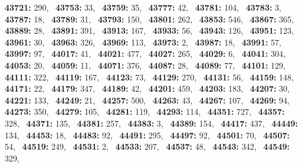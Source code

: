 \textbf{43721:} 290,\allowbreak~ 
\textbf{43753:} 33,\allowbreak~ 
\textbf{43759:} 35,\allowbreak~ 
\textbf{43777:} 42,\allowbreak~ 
\textbf{43781:} 104,\allowbreak~ 
\textbf{43783:} 3,\allowbreak~ 
\textbf{43787:} 18,\allowbreak~ 
\textbf{43789:} 31,\allowbreak~ 
\textbf{43793:} 150,\allowbreak~ 
\textbf{43801:} 262,\allowbreak~ 
\textbf{43853:} 546,\allowbreak~ 
\textbf{43867:} 365,\allowbreak~ 
\textbf{43889:} 28,\allowbreak~ 
\textbf{43891:} 391,\allowbreak~ 
\textbf{43913:} 167,\allowbreak~ 
\textbf{43933:} 56,\allowbreak~ 
\textbf{43943:} 126,\allowbreak~ 
\textbf{43951:} 123,\allowbreak~ 
\textbf{43961:} 30,\allowbreak~ 
\textbf{43963:} 326,\allowbreak~ 
\textbf{43969:} 113,\allowbreak~ 
\textbf{43973:} 2,\allowbreak~ 
\textbf{43987:} 18,\allowbreak~ 
\textbf{43991:} 57,\allowbreak~ 
\textbf{43997:} 97,\allowbreak~ 
\textbf{44017:} 41,\allowbreak~ 
\textbf{44021:} 477,\allowbreak~ 
\textbf{44027:} 265,\allowbreak~ 
\textbf{44029:} 6,\allowbreak~ 
\textbf{44041:} 304,\allowbreak~ 
\textbf{44053:} 20,\allowbreak~ 
\textbf{44059:} 11,\allowbreak~ 
\textbf{44071:} 376,\allowbreak~ 
\textbf{44087:} 28,\allowbreak~ 
\textbf{44089:} 77,\allowbreak~ 
\textbf{44101:} 129,\allowbreak~ 
\textbf{44111:} 322,\allowbreak~ 
\textbf{44119:} 167,\allowbreak~ 
\textbf{44123:} 73,\allowbreak~ 
\textbf{44129:} 270,\allowbreak~ 
\textbf{44131:} 56,\allowbreak~ 
\textbf{44159:} 148,\allowbreak~ 
\textbf{44171:} 22,\allowbreak~ 
\textbf{44179:} 347,\allowbreak~ 
\textbf{44189:} 42,\allowbreak~ 
\textbf{44201:} 459,\allowbreak~ 
\textbf{44203:} 183,\allowbreak~ 
\textbf{44207:} 30,\allowbreak~ 
\textbf{44221:} 133,\allowbreak~ 
\textbf{44249:} 21,\allowbreak~ 
\textbf{44257:} 500,\allowbreak~ 
\textbf{44263:} 43,\allowbreak~ 
\textbf{44267:} 107,\allowbreak~ 
\textbf{44269:} 94,\allowbreak~ 
\textbf{44273:} 350,\allowbreak~ 
\textbf{44279:} 105,\allowbreak~ 
\textbf{44281:} 119,\allowbreak~ 
\textbf{44293:} 114,\allowbreak~ 
\textbf{44351:} 727,\allowbreak~ 
\textbf{44357:} 328,\allowbreak~ 
\textbf{44371:} 135,\allowbreak~ 
\textbf{44381:} 257,\allowbreak~ 
\textbf{44383:} 3,\allowbreak~ 
\textbf{44389:} 154,\allowbreak~ 
\textbf{44417:} 437,\allowbreak~ 
\textbf{44449:} 134,\allowbreak~ 
\textbf{44453:} 18,\allowbreak~ 
\textbf{44483:} 92,\allowbreak~ 
\textbf{44491:} 295,\allowbreak~ 
\textbf{44497:} 92,\allowbreak~ 
\textbf{44501:} 70,\allowbreak~ 
\textbf{44507:} 54,\allowbreak~ 
\textbf{44519:} 249,\allowbreak~ 
\textbf{44531:} 2,\allowbreak~ 
\textbf{44533:} 207,\allowbreak~ 
\textbf{44537:} 48,\allowbreak~ 
\textbf{44543:} 342,\allowbreak~ 
\textbf{44549:} 329,\allowbreak~ 
